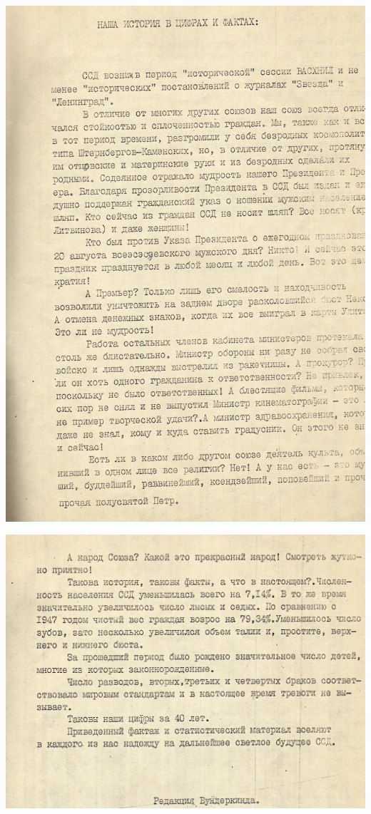 \noindent
\includegraphics[width=\textwidth]{inc/Vynd/Vynd019a}

\noindent
\includegraphics[width=\textwidth]{inc/Vynd/Vynd020a}


